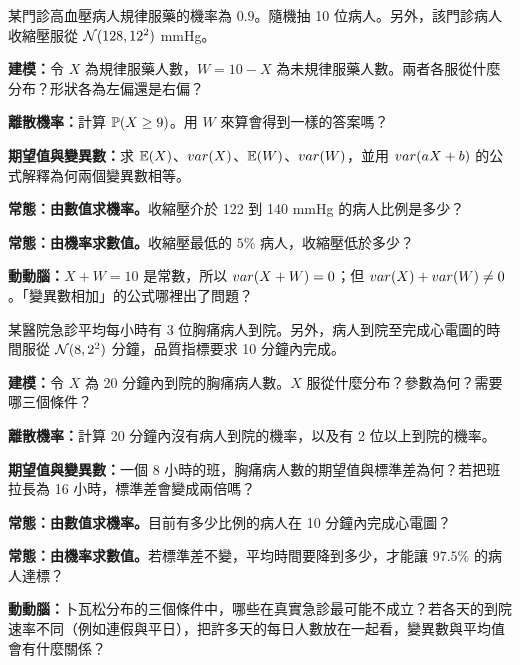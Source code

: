 \members
\begin{scenario}
    某門診高血壓病人規律服藥的機率為 $0.9$。隨機抽 10 位病人。另外，該門診病人收縮壓服從 $\mathcal{N}(128, 12^2)$ mmHg。
\end{scenario}
\begin{questions}
    \item \textbf{建模：}令 $X$ 為規律服藥人數，$W = 10 - X$ 為未規律服藥人數。兩者各服從什麼分布？形狀各為左偏還是右偏？ \blank
    \item \textbf{離散機率：}計算 $\mathbb{P}(X \ge 9)$。用 $W$ 來算會得到一樣的答案嗎？ \blank
    \item \textbf{期望值與變異數：}求 $\mathbb{E}(X)$、$var(X)$、$\mathbb{E}(W)$、$var(W)$，並用 $var(aX+b)$ 的公式解釋為何兩個變異數相等。 \blank
    \item \textbf{常態：由數值求機率。}收縮壓介於 122 到 140 mmHg 的病人比例是多少？ \blank
    \item \textbf{常態：由機率求數值。}收縮壓最低的 $5\%$ 病人，收縮壓低於多少？ \blank
    \item \textbf{動動腦：}$X + W = 10$ 是常數，所以 $var(X+W)=0$；但 $var(X)+var(W) \ne 0$。「變異數相加」的公式哪裡出了問題？ \blank
\end{questions}
\newpage

\members
\begin{scenario}
    某醫院急診平均每小時有 3 位胸痛病人到院。另外，病人到院至完成心電圖的時間服從 $\mathcal{N}(8, 2^2)$ 分鐘，品質指標要求 10 分鐘內完成。
\end{scenario}
\begin{questions}
    \item \textbf{建模：}令 $X$ 為 20 分鐘內到院的胸痛病人數。$X$ 服從什麼分布？參數為何？需要哪三個條件？ \blank
    \item \textbf{離散機率：}計算 20 分鐘內沒有病人到院的機率，以及有 2 位以上到院的機率。 \blank
    \item \textbf{期望值與變異數：}一個 8 小時的班，胸痛病人數的期望值與標準差為何？若把班拉長為 16 小時，標準差會變成兩倍嗎？ \blank
    \item \textbf{常態：由數值求機率。}目前有多少比例的病人在 10 分鐘內完成心電圖？ \blank
    \item \textbf{常態：由機率求數值。}若標準差不變，平均時間要降到多少，才能讓 $97.5\%$ 的病人達標？ \blank
    \item \textbf{動動腦：}卜瓦松分布的三個條件中，哪些在真實急診最可能不成立？若各天的到院速率不同（例如連假與平日），把許多天的每日人數放在一起看，變異數與平均值會有什麼關係？ \blank
\end{questions}
\newpage

